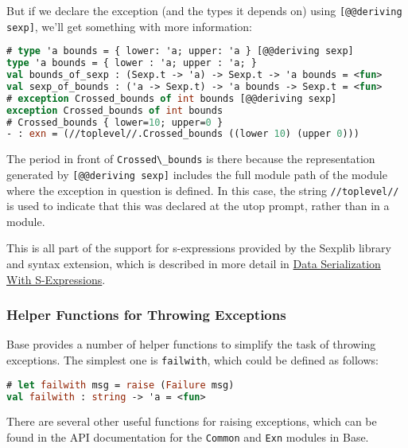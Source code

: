 But if we declare the exception (and the types it depends on) using
\passthrough{\lstinline![@@deriving sexp]!}, we'll get something with
more information:

\begin{lstlisting}[language=Caml]
# type 'a bounds = { lower: 'a; upper: 'a } [@@deriving sexp]
type 'a bounds = { lower : 'a; upper : 'a; }
val bounds_of_sexp : (Sexp.t -> 'a) -> Sexp.t -> 'a bounds = <fun>
val sexp_of_bounds : ('a -> Sexp.t) -> 'a bounds -> Sexp.t = <fun>
# exception Crossed_bounds of int bounds [@@deriving sexp]
exception Crossed_bounds of int bounds
# Crossed_bounds { lower=10; upper=0 }
- : exn = (//toplevel//.Crossed_bounds ((lower 10) (upper 0)))
\end{lstlisting}

The period in front of \passthrough{\lstinline!Crossed\_bounds!} is
there because the representation generated by
\passthrough{\lstinline![@@deriving sexp]!} includes the full module
path of the module where the exception in question is defined. In this
case, the string \passthrough{\lstinline!//toplevel//!} is used to
indicate that this was declared at the utop prompt, rather than in a
module.

This is all part of the support for s-expressions provided by the
Sexplib library and syntax extension, which is described in more detail
in
\href{data-serialization.html\#data-serialization-with-s-expressions}{Data
Serialization With S-Expressions}.

\hypertarget{helper-functions-for-throwing-exceptions}{%
\subsubsection{Helper Functions for Throwing
Exceptions}\label{helper-functions-for-throwing-exceptions}}

Base provides a number of helper functions to simplify the task of
throwing exceptions. The simplest one is
\passthrough{\lstinline!failwith!}, which could be defined as follows:

\begin{lstlisting}[language=Caml]
# let failwith msg = raise (Failure msg)
val failwith : string -> 'a = <fun>
\end{lstlisting}

There are several other useful functions for raising exceptions, which
can be found in the API documentation for the
\passthrough{\lstinline!Common!} and \passthrough{\lstinline!Exn!}
modules in Base.

